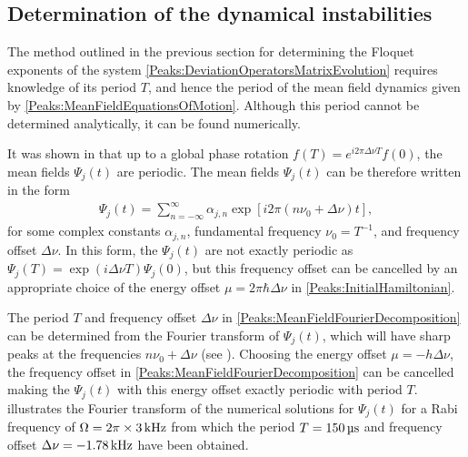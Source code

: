 \subsection{Determination of the dynamical instabilities}
\label{Peaks:ExperimentEigenvalues}

The method outlined in the previous section for determining the Floquet exponents of the system \eqref{Peaks:DeviationOperatorsMatrixEvolution} requires knowledge of its period $T$, and hence the period of the mean field dynamics given by \eqref{Peaks:MeanFieldEquationsOfMotion}. Although this period cannot be determined analytically, it can be found numerically.

It was shown in  that up to a global phase rotation $\displaystyle f(T) = e^{i 2\pi \Delta \nu T}f(0)$, the mean fields $\Psi_j(t)$ are periodic. The mean fields $\Psi_j(t)$ can be therefore written in the form
\begin{align}
    \label{Peaks:MeanFieldFourierDecomposition}
    \Psi_j(t) = \sum_{n=-\infty}^\infty \alpha_{j,n} \exp\left[i 2\pi \left( n \nu_0 + \Delta\nu\right)t \right],
\end{align}
for some complex constants $\alpha_{j, n}$, fundamental frequency $\nu_0 = T^{-1}$, and frequency offset $\Delta \nu$. In this form, the $\Psi_j(t)$ are not exactly periodic as $\Psi_j(T) = \exp(i\Delta \nu T)\Psi_j(0)$, but this frequency offset can be cancelled by an appropriate choice of the energy offset $\mu = 2\pi\hbar \Delta \nu$ in \eqref{Peaks:InitialHamiltonian}.

The period $T$ and frequency offset $\Delta\nu$ in \eqref{Peaks:MeanFieldFourierDecomposition} can be determined from the Fourier transform of $\Psi_j(t)$, which will have sharp peaks at the frequencies $n \nu_0 + \Delta \nu$ (see ). Choosing the energy offset $\mu=-h \Delta\nu$, the frequency offset in \eqref{Peaks:MeanFieldFourierDecomposition} can be cancelled making the $\Psi_j(t)$ with this energy offset exactly periodic with period $T$.  illustrates the Fourier transform of the numerical solutions for $\Psi_j(t)$ for a Rabi frequency of $\Omega = 2 \pi \times \unit[3]{kHz}$ from which the period $T=\unit[150]{\micro{}s}$ and frequency offset $\Delta \nu = \unit[-1.78]{kHz}$ have been obtained.


